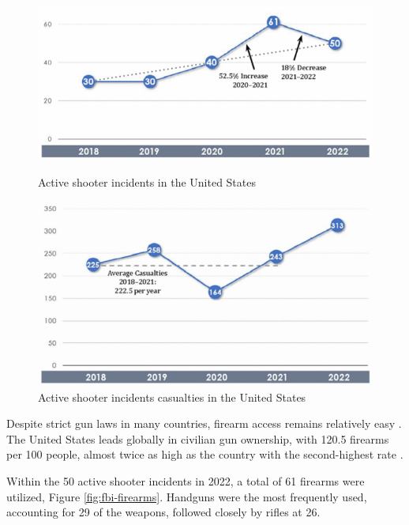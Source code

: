 \begin{figure}[h]
    \centering
    \begin{minipage}{0.49\textwidth}
        \centering
        \includegraphics[width=1\linewidth]{figs/incidents.png}
        \caption{Active shooter incidents in the United States \cite{rfc37}}
        \label{fig:incidents}
    \end{minipage}\hfill
    \begin{minipage}{0.42\textwidth}
        \centering
        \includegraphics[width=1\linewidth]{figs/casualties.png}
        \caption{Active shooter incidents casualties in the United States \cite{rfc37}}
        \label{fig:casualties}
    \end{minipage}
\end{figure}

Despite strict gun laws in many countries, firearm access remains relatively easy \cite{rfc39} \cite{rfc40}. The United States leads globally in civilian gun ownership, with 120.5 firearms per 100 people, almost twice as high as the country with the second-highest rate \cite{rfc32}.

Within the 50 active shooter incidents in 2022, a total of 61 firearms were utilized, Figure \ref{fig:fbi-firearms}. Handguns were the most frequently used, accounting for 29 of the weapons, followed closely by rifles at 26.

